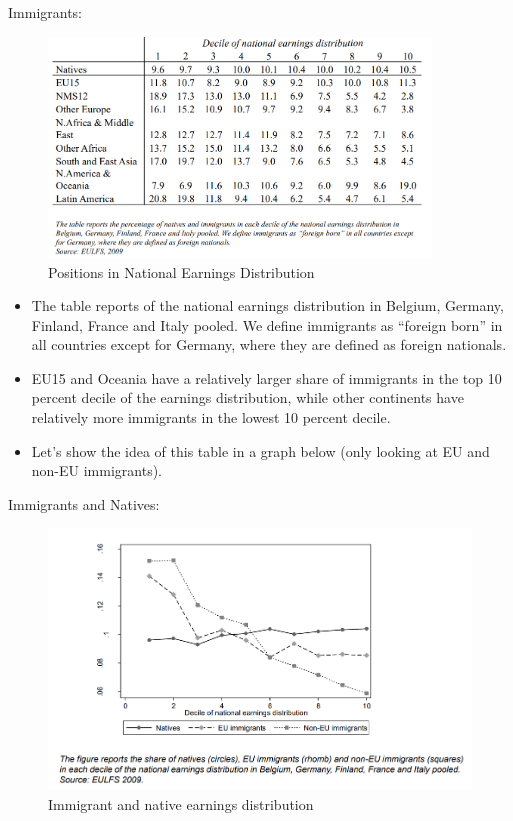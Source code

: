            Immigrants:
            \begin{figure}[H]
                \centering
                \includegraphics[width=4in]{images/ch11/8.png}
                \caption{Positions in National Earnings Distribution}
            \end{figure}
            \begin{itemize}
                \item  The table reports  of the national earnings distribution in Belgium, Germany, Finland, France and Italy pooled. We define immigrants as “foreign born” in all countries except for Germany, where they are defined as foreign nationals.
                \item EU15 and Oceania have a relatively larger share of immigrants in the top 10 percent decile of the earnings distribution, while other continents have relatively more immigrants in the lowest 10 percent decile. 
                \item Let's show the idea of this table in a graph below (only looking at EU and non-EU immigrants).
            \end{itemize}

            Immigrants and Natives:
            
            \begin{figure}[H]
                \centering
                \includegraphics[width=5in]{images/ch11/9.png}
                \caption{Immigrant and native earnings distribution}
            \end{figure}
            
